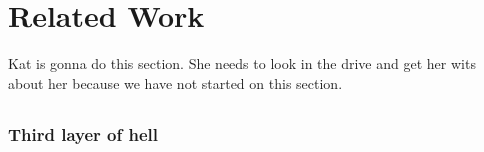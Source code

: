 \section{Related Work}
Kat is gonna do this section. She needs to look in the drive and get her wits about her because we have not started on this section.
\subsection{}

\subsubsection{Third layer of hell}

